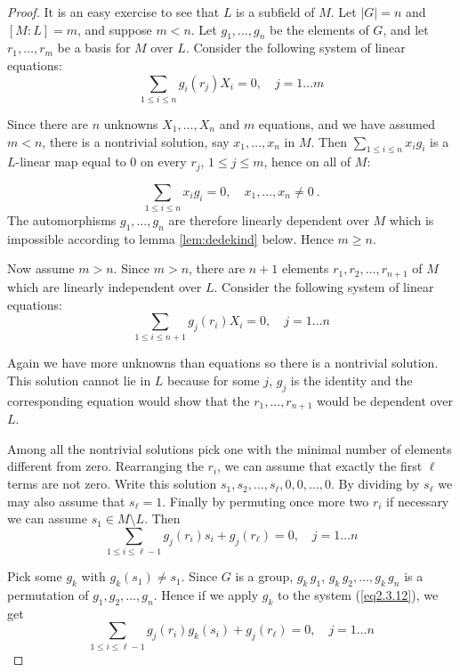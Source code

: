 \begin{proof}
It is an easy exercise to see that $L$ is a subfield of $M$. Let $|G|=n$ and $[M:L]=m$, and suppose $m<n$. Let $g_{1},\ldots,g_{n}$ be the elements of $G$, and let $r_{1},\ldots,r_{m}$ be a basis for $M$ over $L$. Consider the following system of linear equations:
$$\sum_{1\leq i\leq n} g_i(r_j) X_i =0,\quad j=1\ldots m$$

Since there are $n$ unknowns $X_{1},\ldots,X_{n}$ and $m$ equations, and we have assumed $m<n$, there is a nontrivial solution, say $x_{1},\ldots,x_{n}$ in $M$. Then $\displaystyle \sum_{1\leq i\leq n} x_i g_i$ is a $L$-linear map equal to 0 on every $r_j$, $1\leq j\leq m$, hence on all of $M$:

\begin{equation}
\label{eq2.3.10}
\sum_{1\leq i\leq n} x_i g_i = 0, \quad x_1,\ldots,x_n \neq 0\ .
\end{equation}
The automorphisms $g_{1},\ldots,g_{n}$ are therefore linearly dependent over $M$ which is impossible according to lemma \ref{lem:dedekind} below. Hence $m\geq n$.


Now assume $m>n$. Since $m>n$, there are $n+1$ elements $r_{1},r_{2},\ldots,r_{n+1}$ of $M$ which are linearly independent over $L$. Consider the following system of linear equations:
\begin{equation}
\label{eq2.3.14}
\sum_{1\leq i\leq n+1} g_j(r_i) X_i = 0,\quad j=1\ldots n
\end{equation}

Again we have more unknowns than equations so there is a nontrivial solution. This solution cannot lie in $L$ because for some $j$, $g_j$ is the identity and the corresponding equation would show that the $r_{1},\ldots,r_{n+1}$ would be dependent over $L$.

Among all the nontrivial solutions pick one with the minimal number of elements different from zero. Rearranging the $r_i$, we can assume that exactly the first $\ell$ terms are not zero. Write this solution $s_{1},s_{2},\ldots,s_{\ell},0,0,\ldots, 0$. By dividing by $s_{\ell}$ we may also assume that $s_{\ell}=1$. Finally by permuting once more two $r_i$ if necessary we can assume $s_1 \in M\setminus L$. Then
\begin{equation}
\label{eq2.3.12}\sum_{1\leq i\leq \ell-1} g_j(r_i) s_i + g_j(r_{\ell}) = 0,\quad j=1\ldots n\end{equation}

Pick some $g_{k}$ with $g_{k}(s_{1})\neq s_{1}$. Since $G$ is a group, $g_{k}\, g_{1}$, $g_{k}\, g_{2},\ldots,g_{k}\, g_{n}$ is a permutation of $g_{1},g_{2},\ldots,g_{n}$. Hence if we apply $g_{k}$ to the system (\ref{eq2.3.12}), we get
\begin{equation}
\label{eq2.3.13}\sum_{1\leq i\leq \ell-1} g_j(r_i) g_k(s_i) + g_j(r_{\ell}) = 0,\quad j=1\ldots n\end{equation}


\end{proof}
